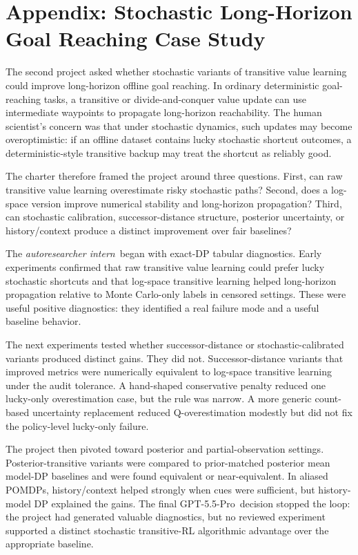 \documentclass{article}
\newcommand{\intern}{\emph{autoresearcher intern}}
\newcommand{\gptpro}{GPT-5.5-Pro}
\begin{document}
\newpage
\appendix

\section{Appendix: Stochastic Long-Horizon Goal Reaching Case Study}
\label{app:stochastic-long-horizon}

The second project asked whether stochastic variants of transitive value learning could improve long-horizon offline goal reaching. In ordinary deterministic goal-reaching tasks, a transitive or divide-and-conquer value update can use intermediate waypoints to propagate long-horizon reachability. The human scientist's concern was that under stochastic dynamics, such updates may become overoptimistic: if an offline dataset contains lucky stochastic shortcut outcomes, a deterministic-style transitive backup may treat the shortcut as reliably good.

The charter therefore framed the project around three questions. First, can raw transitive value learning overestimate risky stochastic paths? Second, does a log-space version improve numerical stability and long-horizon propagation? Third, can stochastic calibration, successor-distance structure, posterior uncertainty, or history/context produce a distinct improvement over fair baselines?

The \intern\ began with exact-DP tabular diagnostics. Early experiments confirmed that raw transitive value learning could prefer lucky stochastic shortcuts and that log-space transitive learning helped long-horizon propagation relative to Monte Carlo-only labels in censored settings. These were useful positive diagnostics: they identified a real failure mode and a useful baseline behavior.

The next experiments tested whether successor-distance or stochastic-calibrated variants produced distinct gains. They did not. Successor-distance variants that improved metrics were numerically equivalent to log-space transitive learning under the audit tolerance. A hand-shaped conservative penalty reduced one lucky-only overestimation case, but the rule was narrow. A more generic count-based uncertainty replacement reduced Q-overestimation modestly but did not fix the policy-level lucky-only failure.

The project then pivoted toward posterior and partial-observation settings. Posterior-transitive variants were compared to prior-matched posterior mean model-DP baselines and were found equivalent or near-equivalent. In aliased POMDPs, history/context helped strongly when cues were sufficient, but history-model DP explained the gains. The final \gptpro\ decision stopped the loop: the project had generated valuable diagnostics, but no reviewed experiment supported a distinct stochastic transitive-RL algorithmic advantage over the appropriate baseline.
\end{document}
